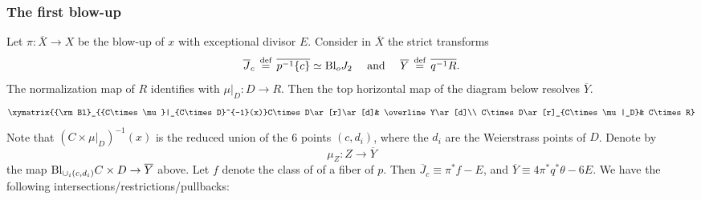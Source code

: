 \documentclass[12pt]{amsart}
\theoremstyle{definition}
\newcommand{\deq}{\ensuremath{\stackrel{\textrm{def}}{=}}}
\newcommand{\?}{ \circled{{\large\bf ?}}}
\begin{document}
\subsubsection{The first blow-up}
Let $\pi:\overline X\to X$ be the blow-up of $x$ with exceptional divisor $E$. Consider in $\overline X$ the strict transforms 
\[\overline J_c\,\deq\, \overline{p^{-1}\{c\}}\simeq {\rm Bl}_oJ_2\quad\text{ and }\quad \overline Y\,\deq\,\overline{q^{-1}R}.\] The normalization map of $R$ identifies with $\mu|_D:D\to R$. 
Then the top horizontal map of the diagram below resolves $\overline Y$.  
\[\xymatrix{{\rm Bl}_{{C\times\mu}|_{C\times D}^{-1}(x)}C\times D\ar[r]\ar[d]& \overline Y\ar[d]\\ C\times D\ar[r]_{C\times\mu|_D}& C\times R}\]
Note that $(C\times\mu|_D)^{-1}(x)$ is the reduced union of the 6 points $(c,d_i)$, where the $d_i$ are the Weierstrass points of $D$. Denote by
\[\mu_Z:Z\to\overline Y\]
the map ${\rm Bl}_{\cup_i(c,d_i)}C\times D\to\overline Y$ above.
Let $f$ denote the class of of a fiber of $p$. Then $\overline J_c\equiv\pi^*f-E$, and $\overline Y\equiv 4\pi^*q^*\theta-6E$. We have the following intersections/restrictions/pullbacks:
\end{document}
